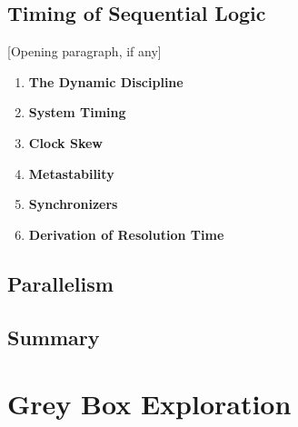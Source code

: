 \documentclass[12pt]{article}
\begin{document}
\subsection{Timing of Sequential Logic}

[Opening paragraph, if any]

\begin{enumerate}
  \item \textbf{The Dynamic Discipline}

  \item \textbf{System Timing}

  \item \textbf{Clock Skew}

  \item \textbf{Metastability}

  \item \textbf{Synchronizers}

  \item \textbf{Derivation of Resolution Time}
\end{enumerate}

\subsection{Parallelism}

\subsection{Summary}

\section{Grey Box Exploration}
\end{document}
